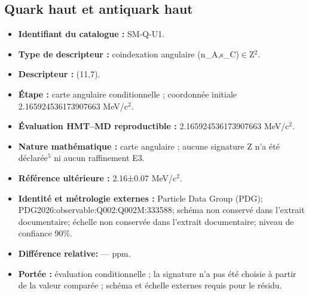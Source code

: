 \subsection{Quark haut et antiquark haut}
\begin{itemize}
\item \textbf{Identifiant du catalogue :} SM-Q-U1.
\item \textbf{Type de descripteur :} coindexation angulaire (n\_A,s\_C)\(\in\)Z\({}^{2}\).
\item \textbf{Descripteur :} (11,7).
\item \textbf{Étape :} carte angulaire conditionnelle ; coordonnée initiale 2.165924\allowbreak{}536173\allowbreak{}907663 MeV/c\({}^{2}\).
\item \textbf{Évaluation HMT--MD reproductible :} 2.165924\allowbreak{}536173\allowbreak{}907663 MeV/c\({}^{2}\).
\item \textbf{Nature mathématique :} carte angulaire ; aucune signature Z n’a été déclarée\({}^{5}\) ni aucun raffinement E3.
\item \textbf{Référence ultérieure :} 2.16±\allowbreak{}0.07 MeV/c\({}^{2}\).
\item \textbf{Identité et métrologie externes :} Particle Data Group (PDG); PDG2026:\allowbreak{}observable:\allowbreak{}Q002:\allowbreak{}Q002M:\allowbreak{}333588; schéma non conservé dans l’extrait documentaire; échelle non conservée dans l’extrait documentaire; niveau de confiance 90\%.
\item \textbf{Différence relative:} --- ppm.
\item \textbf{Portée :} évaluation conditionnelle ; la signature n’a pas été choisie à partir de la valeur comparée ; schéma et échelle externes requis pour le résidu.
\end{itemize}
